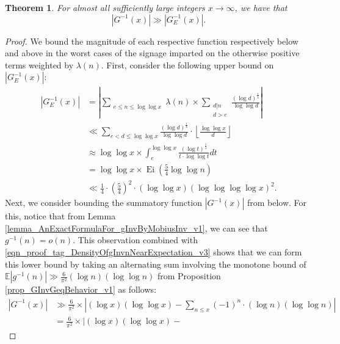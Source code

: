 \documentclass[11pt,reqno,a4letter]{article}
\numberwithin{figure}{section}
\numberwithin{table}{section}
\newcommand{\cf}{\textit{cf.\ }}
\newcommand{\Floor}[2]{\ensuremath{\left\lfloor \frac{#1}{#2} \right\rfloor}}
\theoremstyle{plain}
\newtheorem{theorem}{Theorem}
\numberwithin{theorem}{section}
\theoremstyle{definition}
\begin{document}
\begin{theorem} 
\label{theorem_GInvxLowerBoundByGEInvx_v1} 
For almost all sufficiently large integers $x \rightarrow \infty$, we have that 
\[
|G^{-1}(x)| \gg |G_E^{-1}(x)|. 
\]
\end{theorem} 
\begin{proof} 
We bound the magnitude of each respective function respectively below and above in the worst 
cases of the signage imparted on the otherwise positive terms weighted by $\lambda(n)$. 
First, consider the following upper bound on $|G_E^{-1}(x)|$: 
\begin{align*} 
|G_E^{-1}(x)| & = \left\lvert \sum_{\substack{e \leq n \leq \log\log x}} \lambda(n) \times 
     \sum_{\substack{d|n \\ d > e}} \frac{(\log d)^{\frac{1}{4}}}{\log\log d} 
     \right\rvert \\ 
     & \ll \sum_{e < d \leq \log\log x} \frac{(\log d)^{\frac{1}{4}}}{\log\log d} \cdot 
     \Floor{\log\log x}{d} \\ 
     & \approx \log\log x \times \int_{e}^{\log\log x} \frac{(\log t)^{\frac{1}{4}}}{t \cdot \log\log t} dt \\ 
     & = \log\log x \times \operatorname{Ei}\left(\frac{5}{4} \log\log n\right) \\ 
     & \ll \frac{1}{4} \cdot \left(\frac{5}{4}\right)^2 \cdot (\log\log x) (\log\log\log\log x)^2. 
\end{align*} 
Next, we consider bounding the summatory function $|G^{-1}(x)|$ from below. For this, notice that 
from Lemma \ref{lemma_AnExactFormulaFor_gInvByMobiusInv_v1}, we can see that $g^{-1}(n) = o(n)$. 
This observation combined with \eqref{eqn_proof_tag_DensityOfgInvnNearExpectation_v3} shows that 
we can form this lower bound by taking an alternating sum involving the monotone bound of 
$\mathbb{E}|g^{-1}(n)| \gg \frac{6}{\pi^2} (\log n) (\log\log n)$ from 
Proposition \ref{prop_GInvGeqBehavior_v1} as follows: 
\begin{align*} 
|G^{-1}(x)| & \gg \frac{6}{\pi^2} \times \left\lvert (\log x)(\log\log x) - 
     \sum_{n \leq x} (-1)^n \cdot (\log n) (\log\log n) \right\rvert \\ 
     & = \frac{6}{\pi^2} \times \left\lvert (\log x)(\log\log x) - 

\end{align*}
\end{proof}
\end{document}
